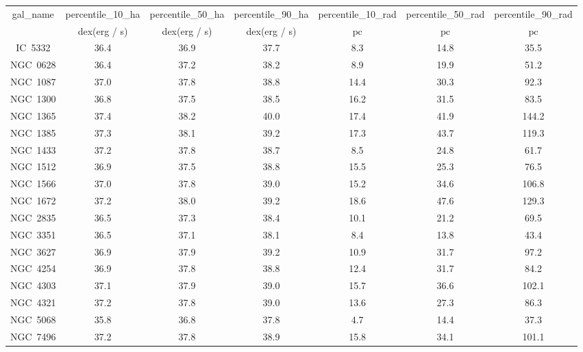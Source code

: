 \begin{table}
\begin{tabular}{ccccccc}
gal_name & percentile_10_ha & percentile_50_ha & percentile_90_ha & percentile_10_rad & percentile_50_rad & percentile_90_rad \\
 & dex(erg / s) & dex(erg / s) & dex(erg / s) & $\mathrm{pc}$ & $\mathrm{pc}$ & $\mathrm{pc}$ \\
IC~5332 & 36.4 & 36.9 & 37.7 & 8.3 & 14.8 & 35.5 \\
NGC~0628 & 36.4 & 37.2 & 38.2 & 8.9 & 19.9 & 51.2 \\
NGC~1087 & 37.0 & 37.8 & 38.8 & 14.4 & 30.3 & 92.3 \\
NGC~1300 & 36.8 & 37.5 & 38.5 & 16.2 & 31.5 & 83.5 \\
NGC~1365 & 37.4 & 38.2 & 40.0 & 17.4 & 41.9 & 144.2 \\
NGC~1385 & 37.3 & 38.1 & 39.2 & 17.3 & 43.7 & 119.3 \\
NGC~1433 & 37.2 & 37.8 & 38.7 & 8.5 & 24.8 & 61.7 \\
NGC~1512 & 36.9 & 37.5 & 38.8 & 15.5 & 25.3 & 76.5 \\
NGC~1566 & 37.0 & 37.8 & 39.0 & 15.2 & 34.6 & 106.8 \\
NGC~1672 & 37.2 & 38.0 & 39.2 & 18.6 & 47.6 & 129.3 \\
NGC~2835 & 36.5 & 37.3 & 38.4 & 10.1 & 21.2 & 69.5 \\
NGC~3351 & 36.5 & 37.1 & 38.1 & 8.4 & 13.8 & 43.4 \\
NGC~3627 & 36.9 & 37.9 & 39.2 & 10.9 & 31.7 & 97.2 \\
NGC~4254 & 36.9 & 37.8 & 38.8 & 12.4 & 31.7 & 84.2 \\
NGC~4303 & 37.1 & 37.9 & 39.0 & 15.7 & 36.6 & 102.1 \\
NGC~4321 & 37.2 & 37.8 & 39.0 & 13.6 & 27.3 & 86.3 \\
NGC~5068 & 35.8 & 36.8 & 37.8 & 4.7 & 14.4 & 37.3 \\
NGC~7496 & 37.2 & 37.8 & 38.9 & 15.8 & 34.1 & 101.1 \\
\end{tabular}
\end{table}
